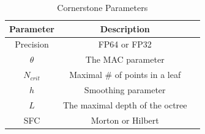 \begin{table}[h!]
    \centering
    \caption{Cornerstone Parameters}
    \label{tab:my_table}
    \begin{tabular}{|c|c|c|}
        \hline
        \textbf{Parameter} & \textbf{Description} \\
        \hline
        Precision & FP64 or FP32 \\
        $\theta$ & The MAC parameter \\
        $N_{crit}$ & Maximal \# of points in a leaf \\ 
        $h$ & Smoothing parameter \\
        $L$ & The maximal depth of the octree \\
        SFC & Morton or Hilbert \\
        \hline
    \end{tabular}
\end{table}
